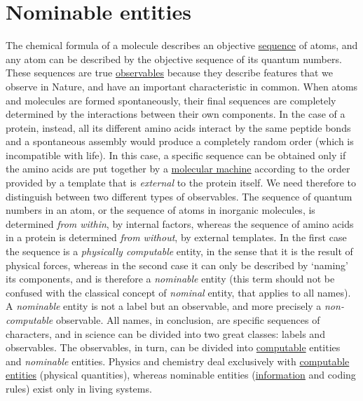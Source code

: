 \documentclass[12pt]{article}
\begin{document}
\section{Nominable entities}
The chemical formula of a molecule describes an objective \hyperlink{sequences}{sequence} of atoms, and any atom can be described by the objective sequence of its quantum numbers. These sequences are true \hyperlink{observables}{observables} because they describe features that we observe in Nature, and have an important characteristic in common. When atoms and molecules are formed spontaneously, their final sequences are completely determined by the interactions between their own components. In the case of a protein, instead, all its different amino acids interact by the same peptide bonds and a spontaneous assembly would produce a completely random order (which is incompatible with life). In this case, a specific sequence can be obtained only if the amino acids are put together by a \hyperlink{molecular_machines}{molecular machine} according to the order provided by a template that is \textit{external} to the protein itself. We need therefore to distinguish between two different types of observables. The sequence of quantum numbers in an atom, or the sequence of atoms in inorganic molecules, is determined \textit{from within}, by internal factors, whereas the sequence of amino acids in a protein is determined \textit{from without}, by external templates. In the first case the sequence is a \textit{physically computable} entity, in the sense that it is the result of physical forces, whereas in the second case it can only be described by `naming' its components, and is therefore a \textit{nominable} entity (this term should not be confused with the classical concept of \textit{nominal} entity, that applies to all names). A \textit{nominable} entity is not a label but an observable, and more precisely a \textit{non-computable} observable. All names, in conclusion, are specific sequences of characters, and in science can be divided into two great classes: labels and observables. The observables, in turn, can be divided into \hyperlink{computable_entities}{computable} entities and \textit{nominable} entities. Physics and chemistry deal exclusively with \hyperlink{computable_entities}{computable entities} (\hypertarget{physical_quantities}{physical quantities}), whereas nominable entities (\hyperlink{organic_information}{information} and coding rules) exist only in living systems. 
 

\hypertarget{observables}{}
\end{document}
